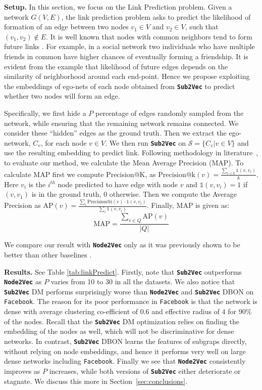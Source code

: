 \documentclass[sigconf]{acmart}
\newcommand{\alg}{{\bf {\tt Sub2Vec}}\xspace}
\newcommand{\nodevec}{{\bf {\tt Node2Vec}}\xspace}
\newcommand{\facebook}{{\tt Facebook}\xspace}
\newcommand{\s}{\mathcal{S}}
\begin{document}
\par \noindent 
\textbf{Setup.}
In this section, we focus on the Link Prediction problem. Given a network $G(V,E)$, the link prediction problem asks to predict the likelihood of formation of an edge between two nodes $v_1 \in V$ and $v_2 \in V$, such that $(v_1,v_2) \notin E$. It is well known that nodes with common neighbors tend to form future links \cite{liben2007link}. For example, in a social network two individuals who have multiple friends in common have higher chances of eventually forming a friendship.  
It is evident from the example that likelihood of future edges depends on the similarity of neighborhood around each end-point. Hence we propose exploiting the embeddings of ego-nets of each node obtained from \alg to predict whether two nodes will form an edge.
 
Specifically, we first hide a $P$ percentage of edges randomly sampled from the network, while ensuring that the remaining network remains connected. We consider these ``hidden'' edges as the ground truth. Then we extract the ego-network, $C_v$, for each node $v \in V$. We then run \alg on $\s = \{C_v | v \in V \}$ and use the resulting embedding to predict link. Following methodology in literature~\cite{wang2016structural}, to evaluate our method, we calculate the Mean Average Precision (MAP). To calculate MAP first we compute Precision@K, as  $\text{Precision@k}(v)= \frac{\sum_{i < k} \mathds{1}(v, v_i)}{k}$. Here $v_i$ is the $i^{th}$ node predicted to have edge with node $v$ and  $\mathds{1}(v, v_i) = 1$ if $(v, v_1)$ is in the ground truth, $0$ otherwise. Then we compute the Average Precision as  $\text{AP}(v) = \frac{\sum_{i} \text{Precision@i}(v)\cdot \mathds{1}(v, v_i)}{\sum_{i}\mathds{1}(v, v_i)}$.  Finally, MAP is given as:
\begin{equation*}
\text{MAP} = \frac{\sum_{v \in Q} \text{AP}(v)}{|Q|}
\end{equation*}

We compare our result with \nodevec only as it was previously shown to be better than other baselines \cite{grover2016node2vec}.

\par \noindent 
\textbf{Results.} See  Table \ref{tab:linkPredict}. Firstly, note that \alg outperforms \nodevec as $P$ varies from 10 to 30 in all the datasets.  We also notice that  \alg DM performs surprisingly worse than \nodevec and \alg DBON on \facebook. The reason for its poor performance in \facebook is that the network is dense with average clustering co-efficient of 0.6 and effective radius of 4 for 90\% of the nodes. Recall that the \alg DM optimization relies on finding the embedding of the nodes as well, which will not be discriminative for dense networks. In contrast, \alg DBON learns the features of subgraps directly, without relying on node embeddings, and hence it performs very well on large dense networks including \facebook. Finally we see that \nodevec consistently improves as $P$ increases, while both versions of \alg either deteriorate or stagnate. We discuss this more in Section~\ref{sec:conclusions}.
\end{document}
